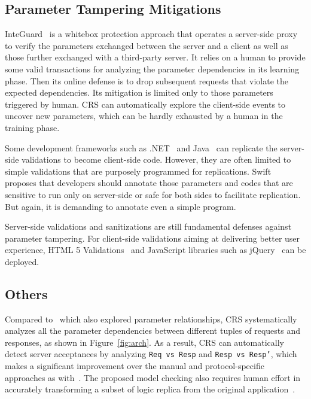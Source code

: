 \documentclass[letter]{sig-alternate-2013}
\begin{document}
\subsection{Parameter Tampering Mitigations}

InteGuard~\cite{integuard} is a whitebox protection approach that operates a server-side proxy to verify the parameters exchanged between the server and a client as well as those further exchanged with a third-party server. It relies on a human to provide some valid transactions for analyzing the parameter dependencies in its learning phase. Then its online defense is to drop subsequent requests that violate the expected dependencies. Its mitigation is limited only to those parameters triggered by human. CRS can automatically explore the client-side events to uncover new parameters, which can be hardly exhausted by a human in the training phase.

Some development frameworks such as .NET~\cite{dotnet} and Java~\cite{googlewebtoolkit} can replicate the server-side validations to become client-side code. However, they are often limited to simple validations that are purposely programmed for replications. Swift~\cite{swift} proposes that developers should annotate those parameters and codes that are sensitive to run only on server-side or safe for both sides to facilitate replication. But again, it is demanding to annotate even a simple program.

Server-side validations and sanitizations are still fundamental defenses against parameter tampering. For client-side validations aiming at delivering better user experience, HTML 5 Validations~\cite{html5} and JavaScript libraries such as jQuery~\cite{jquery} can be deployed.

\subsection{Others}
Compared to~\cite{sso,shop-for-free} which also explored parameter relationships, CRS systematically analyzes all the parameter dependencies between different tuples of requests and responses, as shown in Figure~\ref{fig:arch}. As a result, CRS can automatically detect server acceptances by analyzing \texttt{Req vs Resp} and \texttt{Resp vs Resp'}, which makes a significant improvement over the manual and protocol-specific approaches as with~\cite{sso,shop-for-free}. The proposed model checking also requires human effort in accurately transforming a subset of logic replica from the original application~\cite{shop-for-free}.
\end{document}
